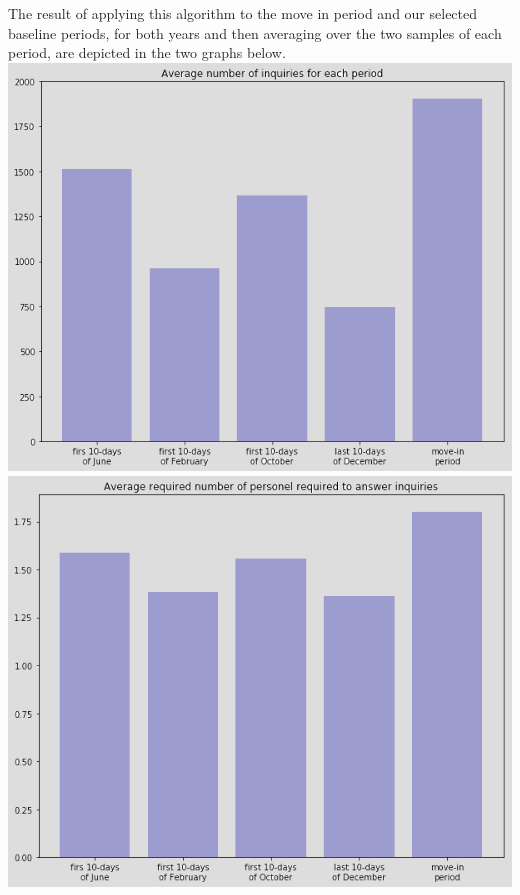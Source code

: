 \documentclass[journal, a4paper]{IEEEtran}
\begin{document}
\tab The result of applying this algorithm to the move in period and our selected baseline
periods, for both years and then averaging over the two samples of each period, are
depicted in the two graphs below.
\newline
\newline
\includegraphics[width=\columnwidth]{inq.png}
\newline
\newline
\includegraphics[width=\columnwidth]{pers.png}
\newline
\end{document}
